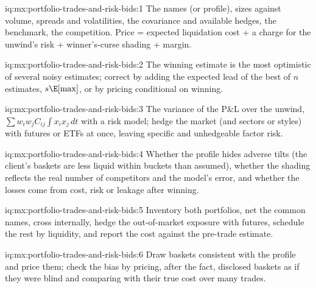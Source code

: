 \begin{solution}{iq:mx:portfolio-trades-and-risk-bids:1}
The names (or profile), sizes against volume, spreads and volatilities, the covariance and available hedges, the benchmark, the competition. Price
= expected liquidation cost + a charge for the unwind's risk + winner's-curse shading + margin.
\end{solution}

\begin{solution}{iq:mx:portfolio-trades-and-risk-bids:2}
The winning estimate is the most optimistic of several noisy estimates; correct by adding the expected lead of the best of $n$ estimates, $s\E[\max]$,
or by pricing conditional on winning.
\end{solution}

\begin{solution}{iq:mx:portfolio-trades-and-risk-bids:3}
The variance of the P\&L over the unwind, $\sum w_iw_jC_{ij}\int x_ix_j\,dt$ with a risk model; hedge the market (and sectors or styles) with futures
or ETFs at once, leaving specific and unhedgeable factor risk.
\end{solution}

\begin{solution}{iq:mx:portfolio-trades-and-risk-bids:4}
Whether the profile hides adverse tilts (the client's baskets are less liquid within buckets than assumed), whether the shading reflects the real
number of competitors and the model's error, and whether the losses come from cost, risk or leakage after winning.
\end{solution}

\begin{solution}{iq:mx:portfolio-trades-and-risk-bids:5}
Inventory both portfolios, net the common names, cross internally, hedge the out-of-market exposure with futures, schedule the rest by liquidity, and
report the cost against the pre-trade estimate.
\end{solution}

\begin{solution}{iq:mx:portfolio-trades-and-risk-bids:6}
Draw baskets consistent with the profile and price them; check the bias by pricing, after the fact, disclosed baskets as if they were blind and
comparing with their true cost over many trades.
\end{solution}
